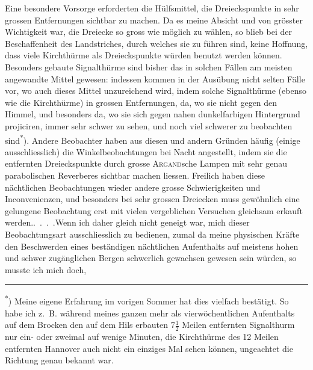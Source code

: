 \par\noindent\hspace*{\parindent}Eine besondere Vorsorge erforderten die Hülfsmittel, die Dreieckspunkte
in sehr grossen Entfernungen sichtbar zu machen. Da es meine Absicht und
von grösster Wichtigkeit war, die Dreiecke so gross wie möglich zu wählen,
so blieb bei der Beschaffenheit des Landstriches, durch welches sie zu führen
sind, keine Hoffnung, dass viele Kirchthürme als Dreieckspunkte würden benutzt
werden können. Besonders gebaute Signalthürme sind bisher das in
solchen Fällen am meisten angewandte Mittel gewesen: indessen kommen in
der Ausübung nicht selten Fälle vor, wo auch dieses Mittel unzureichend
wird, indem solche Signalthürme (ebenso wie die Kirchthürme) in grossen
Entfernungen, da, wo sie nicht gegen den Himmel, und besonders da, wo sie
sich gegen nahen dunkelfarbigen Hintergrund projiciren, immer sehr schwer
zu sehen, und noch viel schwerer zu beobachten sind\textsuperscript{*}). Andere Beobachter
haben aus diesen und andern Gründen häufig (einige ausschliesslich) die
Winkelbeobachtungen bei Nacht angestellt, indem sie die entfernten Dreieckspunkte
durch grosse \textsc{Argand}sche Lampen mit sehr genau parabolischen Reverberes
sichtbar machen liessen. Freilich haben diese nächtlichen Beobachtungen
wieder andere grosse Schwierigkeiten und Inconvenienzen, und besonders bei
sehr grossen Dreiecken muss gewöhnlich eine gelungene Beobachtung erst mit
vielen vergeblichen Versuchen gleichsam erkauft \mbox{werden.\enspace\mbox{.\ .\ .\ .}}\quad Wenn ich
daher gleich nicht geneigt war, mich dieser Beobachtungsart ausschliesslich
zu bedienen, zumal da meine physischen Kräfte den Beschwerden eines beständigen
nächtlichen Aufenthalts auf meistens hohen und schwer zugänglichen
Bergen schwerlich gewachsen gewesen sein würden, so musste ich mich doch,

\par\smallskip\noindent\rule{.24\linewidth}{.4pt}\par\smallskip
{\footnotesize
\noindent\hspace*{\parindent}\textsuperscript{*}) Meine eigene Erfahrung im vorigen Sommer hat dies vielfach bestätigt.
So habe ich z.~B. während meines ganzen mehr als vierwöchentlichen Aufenthalts auf dem Brocken den auf dem Hils
erbauten \(7\tfrac{1}{2}\) Meilen entfernten Signalthurm nur ein- oder zweimal auf wenige Minuten, die Kirchthürme des
12 Meilen entfernten Hannover auch nicht ein einziges Mal sehen können, ungeachtet die Richtung genau bekannt war.\par}
\clearpage

